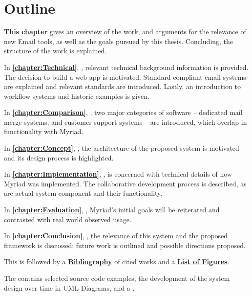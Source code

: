 \section{Outline}

\textbf{This chapter} gives an overview of the work, and arguments for the relevance of new Email tools, as well as the goals pursued by this thesis. Concluding, the structure of the work is explained.

In \textbf{\autoref{chapter:Technical}}, \textbf{}, relevant technical background information is provided. The decision to build a web app is motivated. Standard-compliant email systems are explained and relevant standards are introduced. Lastly, an introduction to workflow systems and historic examples is given.

In \textbf{\autoref{chapter:Comparison}}, \textbf{},  two major categories of software -- dedicated mail merge systems, and customer support systems -- are introduced, which overlap in functionality with Myriad.

In \textbf{\autoref{chapter:Concept}}, \textbf{}, the architecture of the proposed system is motivated and its design process is highlighted.

In \textbf{\autoref{chapter:Implementation}}, \textbf{}, is concerned with technical details of how Myriad was implemented. The collaborative development process is described, as are actual system component and their functionality.

In \textbf{\autoref{chapter:Evaluation}}, \textbf{}, Myriad's initial goals will be reiterated and contrasted with real world observed usage.

In \textbf{\autoref{chapter:Conclusion}}, \textbf{},  the relevance of this system and the proposed framework is discussed; future work is outlined and possible directions proposed.

This is followed by a \textbf{\hyperref[chapter:Bibliography]{Bibliography}} of cited works and a \textbf{\hyperref[chapter:Figures]{List of Figures}}.

The \textbf{} contains selected source code examples, the development of the system design over time in UML Diagrams, and a \textbf{}.

